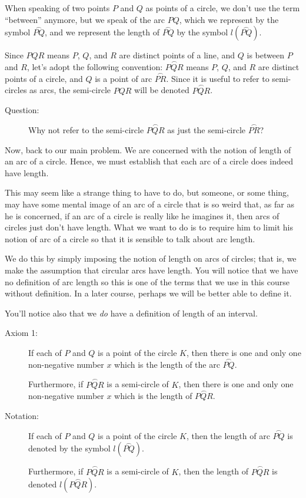 \documentclass[english]{book}
\newcommand{\arc}[1]{\overset{\frown}{#1} }
\begin{document}
When speaking of two points $P$ and $Q$ as points of a circle, we don't use the term ``between'' anymore, but we speak of the arc $PQ$, which we represent by the symbol $\arc{PQ}$, and we represent the length of $\arc{PQ}$ by the symbol $l(\arc{PQ})$.

Since $PQR$ means $P$, $Q$, and $R$ are distinct points of a line, and $Q$ is between $P$ and $R$, let's adopt the following convention: $\arc{PQR}$ means $P$, $Q$, and $R$ are distinct points of a circle, and $Q$ is a point of arc $\arc{PR}$. Since it is useful to refer to semi-circles as arcs, the semi-circle $PQR$ will be denoted $\arc{PQR}$.

\begin{description}
\item[Question:] Why not refer to the semi-circle $\arc{PQR}$ as just the semi-circle $\arc{PR}$?
\end{description}

Now, back to our main problem. We are concerned with the notion of length of an arc of a circle. Hence, we must establish that each arc of a circle does indeed have length. 

This may seem like a strange thing to have to do, but someone, or some thing, may have some mental image of an arc of a circle that is so weird that, as far as he is concerned, if an arc of a circle is really like he imagines it, then arcs of circles just don't have length. What we want to do is to require him to limit his notion of arc of a circle so that it is sensible to talk about arc length. 

We do this by simply imposing the notion of length on arcs of circles; that is, we make the assumption that circular arcs have length. You will notice that we have no definition of arc length so this is one of the terms that we use in this course without definition. In a later course, perhaps we will be better able to define it.

You'll notice also that we \emph{do} have a definition of length of an interval.

\begin{description}

\item[Axiom 1:] If each of $P$ and $Q$ is a point of the circle $K$, then there is one and only one non-negative number $x$ which is the length of the arc $\arc{PQ}$.

  Furthermore, if $\arc{PQR}$ is a semi-circle of $K$, then there is one and only one non-negative number $x$ which is the length of $\arc{PQR}$.

\item[Notation:] If each of $P$ and $Q$ is a point of the circle $K$, then the length of arc $\arc{PQ}$ is denoted by the symbol $l(\arc{PQ})$.

  Furthermore, if $\arc{PQR}$ is a semi-circle of $K$, then the length of $\arc{PQR}$ is denoted $l(\arc{PQR})$.

\end{description}
\end{document}
